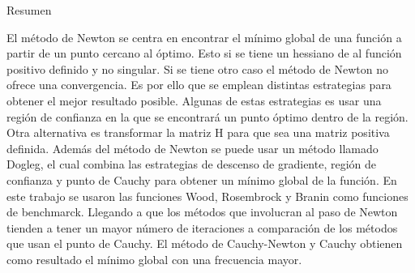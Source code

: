 \begin{center}
    \begin{minipage}{0.85\linewidth}
        \begin{center}
            Resumen
        \end{center}
        \vspace{-0.5cm}
        El método de Newton se centra en encontrar el mínimo global de una función a partir de un punto cercano al óptimo. Esto si se tiene un hessiano de al función positivo definido y no singular. Si se tiene otro caso el método de Newton no ofrece una convergencia. Es por ello que se emplean distintas estrategias para obtener el mejor resultado posible. Algunas de estas estrategias es usar una región de confianza en la que se encontrará un punto óptimo dentro de la región. Otra alternativa es transformar la matriz H para que sea una matriz positiva definida. Además del método de Newton se puede usar un método llamado Dogleg, el cual combina las estrategias de descenso de gradiente, región de confianza y punto de Cauchy para obtener un mínimo global de la función. En este trabajo se usaron las funciones Wood, Rosembrock y Branin como funciones de benchmarck. Llegando a que los métodos que involucran al paso de Newton tienden a tener un mayor número de iteraciones a comparación de los métodos que usan el punto de Cauchy. El método de Cauchy-Newton y Cauchy obtienen como resultado el mínimo global con una frecuencia mayor.
    \end{minipage}
\end{center}